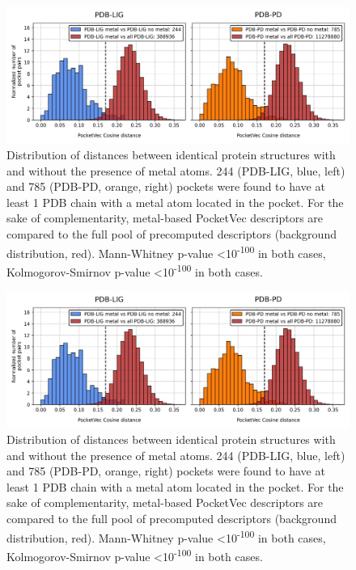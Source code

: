 \begin{figure}[htbp]
  \centering
  \includegraphics[width=0.9\linewidth]{figures/PocketVec/Supplementary/FigS25.png}
  \caption{
  Distribution of distances between identical protein structures with and without the presence of metal atoms. 244 (PDB-LIG, blue, left) and 785 (PDB-PD, orange, right) pockets were found to have at least 1 PDB chain with a metal atom located in the pocket. For the sake of complementarity, metal-based PocketVec descriptors are compared to the full pool of precomputed descriptors (background distribution, red). Mann-Whitney p-value <10\textsuperscript{-100} in both cases, Kolmogorov-Smirnov p-value <10\textsuperscript{-100} in both cases.
  }
  \label{PocketVec_FigS25}
\end{figure}



\begin{figure}[htbp]
  \centering
  \includegraphics[width=0.9\linewidth]{figures/PocketVec/Supplementary/FigS25.png}
  \caption{
  Distribution of distances between identical protein structures with and without the presence of metal atoms. 244 (PDB-LIG, blue, left) and 785 (PDB-PD, orange, right) pockets were found to have at least 1 PDB chain with a metal atom located in the pocket. For the sake of complementarity, metal-based PocketVec descriptors are compared to the full pool of precomputed descriptors (background distribution, red). Mann-Whitney p-value <10\textsuperscript{-100} in both cases, Kolmogorov-Smirnov p-value <10\textsuperscript{-100} in both cases.
  }
  \label{PocketVec_FigS25}
\end{figure}





